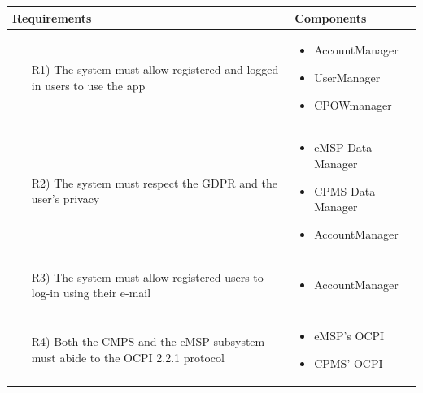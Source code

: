 \documentclass[table, 12pt]{article}
\begin{document}
\begin{longtable}{|p{}|p{}|}
    \hline
    \textbf{Requirements} & \textbf{Components} \\\hline\hline
    \begin{itemize}
        \item[R1)] The system must allow registered and logged-in users to use the app
    \end{itemize}
    & 
    \begin{itemize}
        \item AccountManager
        \item UserManager
        \item CPOWmanager
    \end{itemize}
    \\\hline

    \begin{itemize}
        \item[R2)] The system must respect the GDPR and the user's privacy
    \end{itemize}
    & 
    \begin{itemize}
        \item eMSP Data Manager
        \item CPMS Data Manager
        \item AccountManager
    \end{itemize}
    \\\hline

    \begin{itemize}
        \item[R3)] The system must allow registered users to log-in using their e-mail
    \end{itemize}
    & 
    \begin{itemize}
        \item AccountManager
    \end{itemize}
    \\\hline

    \begin{itemize}
        \item[R4)] Both the CMPS and the eMSP subsystem must abide to the OCPI 2.2.1 protocol
    \end{itemize}
    & 
    \begin{itemize}
        \item eMSP's OCPI
        \item CPMS' OCPI
    \end{itemize}
    \\\hline


\end{longtable}
\end{document}

